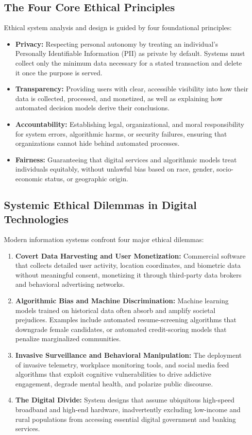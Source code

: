 \documentclass[11pt,a4paper]{article}
\begin{document}
\subsection{The Four Core Ethical Principles}
Ethical system analysis and design is guided by four foundational principles:
\begin{itemize}
    \item \textbf{Privacy:} Respecting personal autonomy by treating an individual's Personally Identifiable Information (PII) as private by default. Systems must collect only the minimum data necessary for a stated transaction and delete it once the purpose is served.
    \item \textbf{Transparency:} Providing users with clear, accessible visibility into how their data is collected, processed, and monetized, as well as explaining how automated decision models derive their conclusions.
    \item \textbf{Accountability:} Establishing legal, organizational, and moral responsibility for system errors, algorithmic harms, or security failures, ensuring that organizations cannot hide behind automated processes.
    \item \textbf{Fairness:} Guaranteeing that digital services and algorithmic models treat individuals equitably, without unlawful bias based on race, gender, socio-economic status, or geographic origin.
\end{itemize}

\subsection{Systemic Ethical Dilemmas in Digital Technologies}
Modern information systems confront four major ethical dilemmas:
\begin{enumerate}
    \item \textbf{Covert Data Harvesting and User Monetization:} Commercial software that collects detailed user activity, location coordinates, and biometric data without meaningful consent, monetizing it through third-party data brokers and behavioral advertising networks.
    \item \textbf{Algorithmic Bias and Machine Discrimination:} Machine learning models trained on historical data often absorb and amplify societal prejudices. Examples include automated resume-screening algorithms that downgrade female candidates, or automated credit-scoring models that penalize marginalized communities.
    \item \textbf{Invasive Surveillance and Behavioral Manipulation:} The deployment of invasive telemetry, workplace monitoring tools, and social media feed algorithms that exploit cognitive vulnerabilities to drive addictive engagement, degrade mental health, and polarize public discourse.
    \item \textbf{The Digital Divide:} System designs that assume ubiquitous high-speed broadband and high-end hardware, inadvertently excluding low-income and rural populations from accessing essential digital government and banking services.
\end{enumerate}
\end{document}
